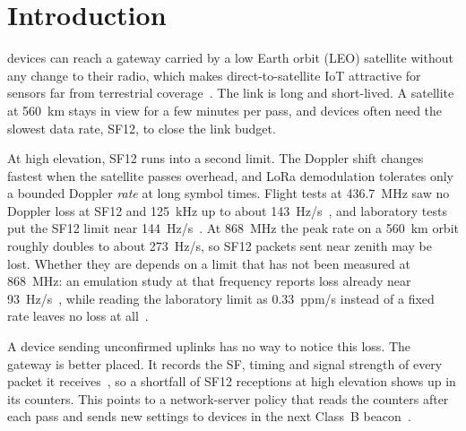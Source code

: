 \documentclass[journal]{IEEEtran}
\begin{document}
\section{Introduction}
 devices can reach a gateway carried by a low Earth orbit (LEO) satellite without any change to their radio, which makes direct-to-satellite IoT attractive for sensors far from terrestrial coverage~\cite{alvarez2022,asadullah2024}. The link is long and short-lived. A satellite at 560~km stays in view for a few minutes per pass, and devices often need the slowest data rate, SF12, to close the link budget.

At high elevation, SF12 runs into a second limit. The Doppler shift changes fastest when the satellite passes overhead, and LoRa demodulation tolerates only a bounded Doppler \emph{rate} at long symbol times. Flight tests at 436.7~MHz saw no Doppler loss at SF12 and 125~kHz up to about 143~Hz/s~\cite{zadorozhny2022}, and laboratory tests put the SF12 limit near 144~Hz/s~\cite{doroshkin2019}. At 868~MHz the peak rate on a 560~km orbit roughly doubles to about 273~Hz/s, so SF12 packets sent near zenith may be lost. Whether they are depends on a limit that has not been measured at 868~MHz: an emulation study at that frequency reports loss already near 93~Hz/s~\cite{colombo2022}, while reading the laboratory limit as 0.33~ppm/s instead of a fixed rate leaves no loss at all~\cite{doroshkin2019}.

A device sending unconfirmed uplinks has no way to notice this loss. The gateway is better placed. It records the SF, timing and signal strength of every packet it receives~\cite{sx1301}, so a shortfall of SF12 receptions at high elevation shows up in its counters. This points to a network-server policy that reads the counters after each pass and sends new settings to devices in the next Class~B beacon~\cite{lorawanL2}.
\end{document}
